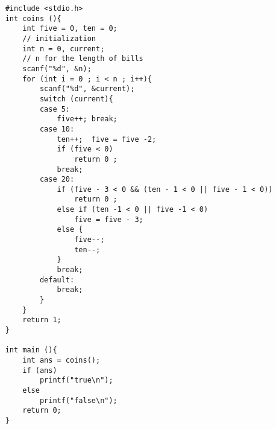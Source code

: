 \documentclass[a4paper, 10pt]{ctexart} %
\begin{document}
\begin{verbatim}
    #include <stdio.h>
    int coins (){
        int five = 0, ten = 0;
        // initialization
        int n = 0, current; 
        // n for the length of bills
        scanf("%d", &n);
        for (int i = 0 ; i < n ; i++){
            scanf("%d", &current);
            switch (current){
            case 5:
                five++; break;
            case 10:
                ten++;  five = five -2;
                if (five < 0) 
                    return 0 ;
                break;
            case 20:
                if (five - 3 < 0 && (ten - 1 < 0 || five - 1 < 0))
                    return 0 ;
                else if (ten -1 < 0 || five -1 < 0)
                    five = five - 3;
                else {
                    five--;
                    ten--;
                }
                break;
            default:
                break;
            }
        }
        return 1;
    }

    int main (){
        int ans = coins();
        if (ans)
            printf("true\n");
        else 
            printf("false\n");
        return 0;
    }
\end{verbatim}
\end{document}
